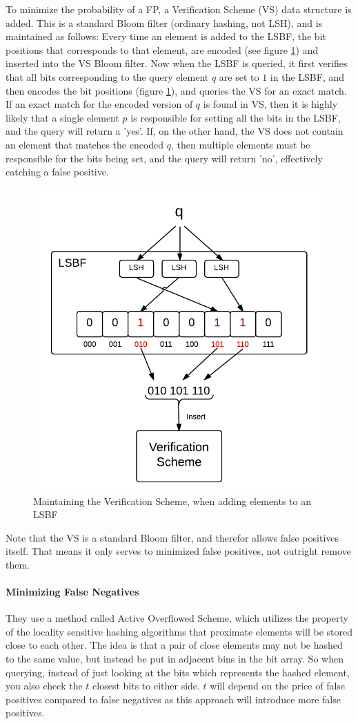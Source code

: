 \documentclass[a4paper,11pt]{article}
\begin{document}
To minimize the probability of a FP, a Verification Scheme (VS) data structure is added.
This is a standard Bloom filter (ordinary hashing, not LSH), and is maintained as follows: Every time an element is added to the LSBF, the bit positions that corresponds to that element, are encoded (see figure \ref{fig:verification_scheme}) and inserted into the VS Bloom filter.
Now when the LSBF is queried, it first verifies that all bits corresponding to the query element $q$ are set to $1$ in the LSBF, and then encodes the bit positions (figure \ref{fig:verification_scheme}), and queries the VS for an exact match. If an exact match for the encoded version of $q$ is found in VS, then it is highly likely that a single element $p$ is responsible for setting all the bits in the LSBF, and the query will return a 'yes'. If, on the other hand, the VS does not contain an element that matches the encoded $q$, then multiple elements must be responsible for the bits being set, and the query will return 'no', effectively catching a false positive.

\begin{figure}[H]
\centering
\includegraphics[width=.5\linewidth]{verification_scheme}
\caption{Maintaining the Verification Scheme, when adding elements to an LSBF}
\label{fig:verification_scheme}
\end{figure}


Note that the VS is a standard Bloom filter, and therefor allows false positives itself. That means it only serves to minimized false positives, not outright remove them.

\paragraph{Minimizing False Negatives}
They use a method called Active Overflowed Scheme, which utilizes the property of the locality sensitive hashing algorithms that proximate elements will be stored close to each other. The idea is that a pair of close elements may not be hashed to the same value, but instead be put in adjacent bins in the bit array. So when querying, instead of just looking at the bits which represents the hashed element, you also check the $t$ closest bits to either side. $t$ will depend on the price of false positives compared to false negatives as this approach will introduce more false positives.\\
\end{document}

